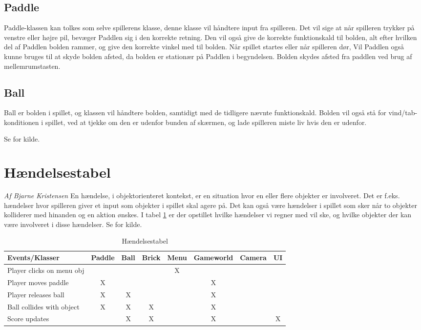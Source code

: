 \subsection{Paddle}
Paddle-klassen kan tolkes som selve spillerens klasse, denne klasse vil håndtere input fra spilleren. Det vil sige at når spilleren trykker på venstre eller højre pil, bevæger Paddlen sig i den korrekte retning. Den vil også give de korrekte funktionskald til bolden, alt efter hvilken del af Paddlen bolden rammer, og give den korrekte vinkel med til bolden. Når spillet startes eller når spilleren dør, Vil Paddlen også kunne bruges til at skyde bolden afsted, da bolden er stationær på Paddlen i begyndelsen. Bolden skydes afsted fra paddlen ved brug af mellemrumstasten. 

\subsection{Ball}
Ball er bolden i spillet, og klassen vil håndtere bolden, samtidigt med de tidligere nævnte funktionskald. Bolden vil også stå for vind/tab-konditionen i spillet, ved at tjekke om den er udenfor bunden af skærmen, og lade spilleren miste liv hvis den er udenfor.\newline \newline

Se \cite[chap. 4]{Mathiassen200006} for kilde.


\section{Hændelsestabel}
\textit{Af Bjarne Kristensen}\newline
En hændelse, i objektorienteret kontekst, er en situation hvor en eller flere objekter er involveret. Det er f.eks. hændelser hvor spilleren giver et input som objekter i spillet skal agere på. Det kan også være hændelser i spillet som sker når to objekter kolliderer med hinanden og en aktion ønskes. I tabel \ref{eventtabel} er der opstillet hvilke hændelser vi regner med vil ske, og hvilke objekter der kan være involveret i disse hændelser.\newline \newline
Se \cite[chap. 3]{Mathiassen200006} for kilde.
\begin{table}[]
\centering
\caption{Hændelsestabel}
\label{eventtabel}
\begin{tabular}{|l|c|c|c|c|c|c|c|}
\hline
Events/Klasser & Paddle & Ball & Brick & Menu & Gameworld & Camera & UI \\ \hline
Player clicks on menu obj &  &  &  & X &  &  &  \\ \hline
Player moves paddle & X &  &  &  & X &  &  \\ \hline
Player releases ball & X & X &  &  & X &  &  \\ \hline
Ball collides with object & X & X & X &  & X &  &  \\ \hline
Score updates &  & X & X &  & X &  & X \\ \hline
\end{tabular}
\end{table}

